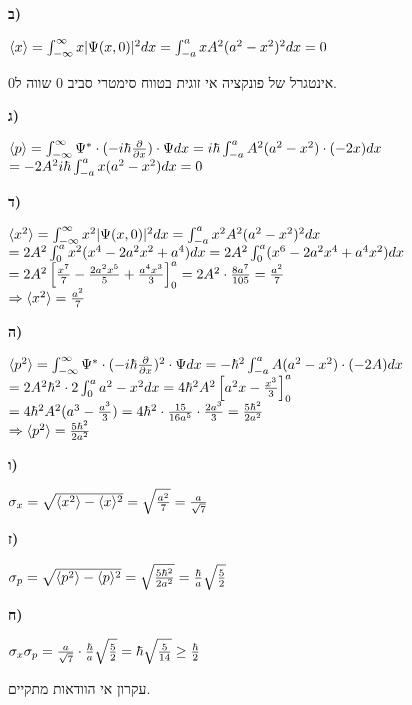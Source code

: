 \documentclass[14pt]{extarticle}
\makeatletter
\newenvironment{lefteqs}{%
    \begin{english}%
    \begin{flushleft}%
    \renewcommand{\arraystretch}{1.3}%
    $\begin{array}{@{}l@{}}%
}{%
    \end{array}$%
    \end{flushleft}%
    \end{english}%
}
\makeatother
\begin{document}
\textbf{ב)}
\begin{lefteqs}
    \langle x \rangle = \int_{-\infty}^{\infty} x |\Psi(x,0)|^2 dx = \int_{-a}^{a} x A^2 (a^2 - x^2)^2 dx = 0
\end{lefteqs}
אינטגרל של פונקציה אי זוגית בטווח סימטרי סביב 0 שווה ל0.

\textbf{ג)}
\begin{lefteqs}
    \langle p \rangle = \int_{-\infty}^{\infty} \Psi^* \cdot (-i\hbar \frac{\partial}{\partial x}) \cdot \Psi dx
    = i\hbar \int_{-a}^{a} A^2 (a^2 - x^2) \cdot (-2x) dx \\
    = -2A^2 i\hbar \int_{-a}^{a} x(a^2 - x^2) dx = 0
\end{lefteqs}

\textbf{ד)}
\begin{lefteqs}
    \langle x^2 \rangle = \int_{-\infty}^{\infty} x^2 |\Psi(x,0)|^2 dx = \int_{-a}^{a} x^2 A^2 (a^2 - x^2)^2 dx  \\
    = 2A^2 \int_{0}^{a} x^2(x^4-2a^2x^2+a^4) dx =2A^2 \int_{0}^{a} (x^6 - 2a^2x^4 + a^4x^2) dx \\
    = 2A^2 \left[ \frac{x^7}{7} - \frac{2a^2x^5}{5} + \frac{a^4x^3}{3} \right]_{0}^{a} = 2A^2 \cdot \frac{8 a^7}{105} = \frac{a^2}{7} \\
    \Rightarrow \langle x^2 \rangle = \frac{a^2}{7}
\end{lefteqs}

\textbf{ה)}
\begin{lefteqs}
    \langle p^2 \rangle = \int_{-\infty}^{\infty} \Psi^* \cdot (-i\hbar \frac{\partial}{\partial x})^2 \cdot \Psi dx = -\hbar^2 \int_{-a}^{a} A(a^2 - x^2) \cdot (-2A) dx \\
    = 2A^2\hbar^2 \cdot 2 \int_{0}^ {a}a^2-x^2 dx  = 4\hbar^2A^2 \left[ a^2x-\frac{x^3}{3} \right]_{0}^{a} \\
    = 4\hbar^2A^2 (a^3-\frac{a^3}{3})=  4\hbar^2  \cdot \frac{15}{16a^5}\cdot  \frac{2a^3}{3}  = \frac{5\hbar^2}{2a^2} \\
    \Rightarrow \langle p^2 \rangle = \frac{5\hbar^2}{2a^2}
\end{lefteqs}

\textbf{ו)}
\begin{lefteqs}
    \sigma_x = \sqrt{\langle x^2 \rangle - \langle x \rangle^2} = \sqrt{\frac{a^2}{7}} = \frac{a}{\sqrt{7}} \\
\end{lefteqs}

\textbf{ז)}
\begin{lefteqs}
    \sigma_p = \sqrt{\langle p^2 \rangle - \langle p \rangle^2} = \sqrt{\frac{5\hbar^2}{2a^2}} = \frac{\hbar}{a} \sqrt{\frac{5}{2}} \\
\end{lefteqs}

\textbf{ח)}
\begin{lefteqs}
    \sigma_x \sigma_p = \frac{a}{\sqrt{7}} \cdot \frac{\hbar}{a} \sqrt{\frac{5}{2}} = \hbar \sqrt{\frac{5}{14}} \ge \frac{\hbar}{2}
\end{lefteqs}
עקרון אי הוודאות מתקיים.
\end{document}
